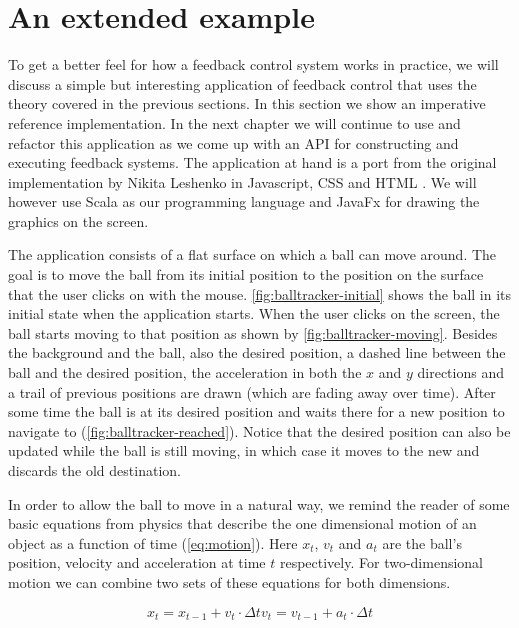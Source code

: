 \section{An extended example}
To get a better feel for how a feedback control system works in practice, we will discuss a simple but interesting application of feedback control that uses the theory covered in the previous sections. In this section we show an imperative reference implementation. In the next chapter we will continue to use and refactor this application as we come up with an API for constructing and executing feedback systems. The application at hand is a port from the original implementation by Nikita Leshenko in Javascript, CSS and HTML \cite{nikital-balltracker}. We will however use Scala as our programming language and JavaFx for drawing the graphics on the screen.

The application consists of a flat surface on which a ball can move around. The goal is to move the ball from its initial position to the position on the surface that the user clicks on with the mouse. \autoref{fig:balltracker-initial} shows the ball in its initial state when the application starts. When the user clicks on the screen, the ball starts moving to that position as shown by \autoref{fig:balltracker-moving}. Besides the background and the ball, also the desired position, a dashed line between the ball and the desired position, the acceleration in both the $x$ and $y$ directions and a trail of previous positions are drawn (which are fading away over time). After some time the ball is at its desired position and waits there for a new position to navigate to (\autoref{fig:balltracker-reached}). Notice that the desired position can also be updated while the ball is still moving, in which case it moves to the new and discards the old destination.

In order to allow the ball to move in a natural way, we remind the reader of some basic equations from physics that describe the one dimensional motion of an object as a function of time (\autoref{eq:motion}). Here $x_t$, $v_t$ and $a_t$ are the ball's position, velocity and acceleration at time $t$ respectively. For two-dimensional motion we can combine two sets of these equations for both dimensions.

\begin{subequations}
	\begin{equation}
		x_t = x_{t - 1} + v_t \cdot \Delta t
	\end{equation}
	\begin{equation}
		v_t = v_{t - 1} + a_t \cdot \Delta t
	\end{equation}
	\label{eq:motion}
\end{subequations}

